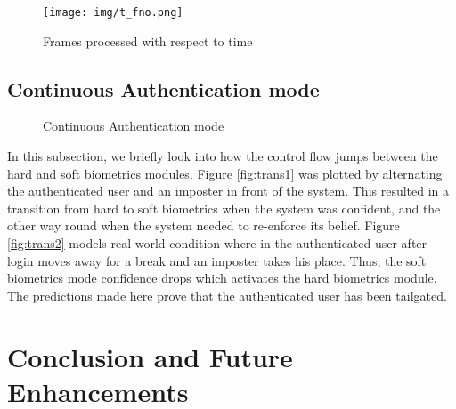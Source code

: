 \documentclass[12pt]{report}			%
\begin{document}
\begin{figure}[h!]
	\centering
	\texttt{[image: img/t\_fno.png]}
	\caption{Frames processed with respect to time}
	\label{fig:ftime}
\end{figure}

\section{Continuous Authentication mode}
\begin{figure}
	\centering
	\quad
	\caption{Continuous Authentication mode}
\end{figure}
In this subsection, we briefly look into how the control flow jumps between the hard and soft biometrics modules.
Figure \ref{fig:trans1} was plotted by alternating the authenticated user and an imposter in front of the system.
This resulted in a transition from hard to soft biometrics when the system was confident, and the other way round when the system needed to re-enforce its belief.
Figure \ref{fig:trans2} models real-world condition where in the authenticated user after login moves away for a break and an imposter takes his place.
Thus, the soft biometrics mode confidence drops which activates the hard biometrics module.
The predictions made here prove that the authenticated user has been tailgated.

\newpage
\chapter{ Conclusion and Future Enhancements }
\end{document}
